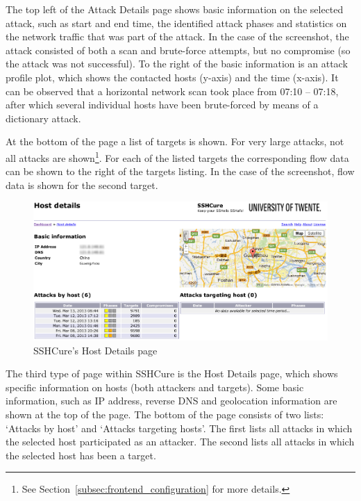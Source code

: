 The top left of the Attack Details page shows basic information on the selected attack, such as start and end time, the identified attack phases and statistics on the network traffic that was part of the attack. In the case of the screenshot, the attack consisted of both a scan and brute-force attempts, but no compromise (so the attack was not successful). To the right of the basic information is an attack profile plot, which shows the contacted hosts (y-axis) and the time (x-axis). It can be observed that a horizontal network scan took place from 07:10 -- 07:18, after which several individual hosts have been brute-forced by means of a dictionary attack.

At the bottom of the page a list of targets is shown. For very large attacks, not all attacks are shown\footnote{See Section~\ref{subsec:frontend_configuration} for more details.}. For each of the listed targets the corresponding flow data can be shown to the right of the targets listing. In the case of the screenshot, flow data is shown for the second target.

\newpage

\begin{figure}[!ht]
	\centering
    	\includegraphics[width=\textwidth]{img/Screenshot_HostDetails_anonymized.png}
	\caption{SSHCure's Host Details page}
	\label{fig:screenshot_HostDetails}
\end{figure}

The third type of page within SSHCure is the Host Details page, which shows specific information on hosts (both attackers and targets). Some basic information, such as IP address, reverse DNS and geolocation information are shown at the top of the page. The bottom of the page consists of two lists: `Attacks by host' and `Attacks targeting hosts'. The first lists all attacks in which the selected host participated as an attacker. The second lists all attacks in which the selected host has been a target.
